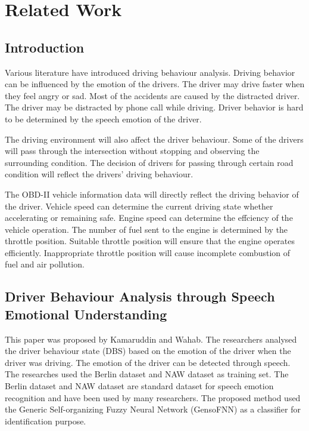 \chapter{Related Work}
\section{Introduction}
Various literature have introduced driving behaviour analysis. Driving behavior can be influenced by the emotion of the drivers. The driver may drive faster when they feel angry or sad. Most of the accidents are caused by the distracted driver. The driver may be distracted by phone call while driving. Driver behavior is hard to be determined by the speech emotion of the driver.\cite{kamaruddin:wahab:2010}

The driving environment will also affect the driver behaviour. Some of the drivers will pass through the intersection without stopping and observing the surrounding condition. The decision of drivers for passing through certain road condition will reflect the drivers' driving behaviour.

The OBD-II vehicle information data will directly reflect the driving behavior of the driver. Vehicle speed can determine the current driving state whether accelerating or remaining safe. Engine speed can determine the effciency of the vehicle operation. The number of fuel sent to the engine is determined by the throttle position. Suitable throttle position will ensure that the engine operates efficiently. Inappropriate throttle position will cause incomplete combustion of fuel and air pollution.\cite{chen:pan:lu:2015}   

\section{Driver Behaviour Analysis through Speech Emotional Understanding}
This paper was proposed by Kamaruddin and Wahab\citeyear{kamaruddin:wahab:2010}. The researchers analysed the driver behaviour state (DBS) based on the emotion of the driver when the driver was driving. The emotion of the driver can be detected through speech. 
The researches used the Berlin dataset and NAW dataset as training set. The Berlin dataset and NAW dataset are standard dataset for speech emotion recognition and have been used by many researchers.
The proposed method used the Generic Self-organizing Fuzzy Neural Network (GensoFNN) as a classifier for identification purpose. 
